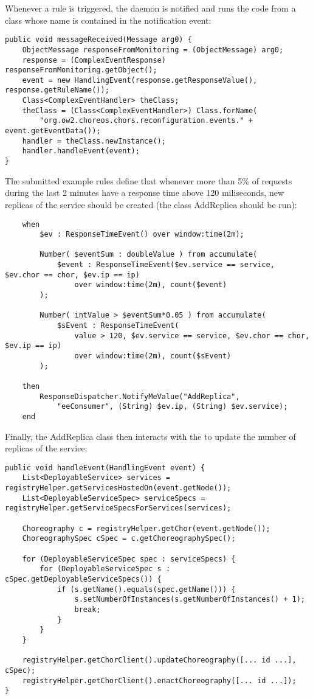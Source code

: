 Whenever a rule is triggered, the daemon is notified and runs the code
from a class whose name is contained in the notification event:

\begin{verbatim}
public void messageReceived(Message arg0) { 
    ObjectMessage responseFromMonitoring = (ObjectMessage) arg0;
    response = (ComplexEventResponse) responseFromMonitoring.getObject();
    event = new HandlingEvent(response.getResponseValue(), response.getRuleName());
    Class<ComplexEventHandler> theClass;
    theClass = (Class<ComplexEventHandler>) Class.forName(
        "org.ow2.choreos.chors.reconfiguration.events." + event.getEventData());
    handler = theClass.newInstance();
    handler.handleEvent(event);
}
\end{verbatim}

The submitted example rules define that whenever more than 5\% of requests
during the last 2 minutes have a response time above 120 miliseconds, new replicas of
the service should be created (the class \textsf{AddReplica} should be run):

\begin{verbatim}
    when
        $ev : ResponseTimeEvent() over window:time(2m);
        
        Number( $eventSum : doubleValue ) from accumulate(
            $event : ResponseTimeEvent($ev.service == service, $ev.chor == chor, $ev.ip == ip)
                over window:time(2m), count($event)
        );
            
        Number( intValue > $eventSum*0.05 ) from accumulate(
            $sEvent : ResponseTimeEvent(
                value > 120, $ev.service == service, $ev.chor == chor, $ev.ip == ip)
                over window:time(2m), count($sEvent)
        );

    then
        ResponseDispatcher.NotifyMeValue("AddReplica",
            "eeConsumer", (String) $ev.ip, (String) $ev.service);
    end
\end{verbatim}

Finally, the \textsf{AddReplica} class then interacts with the \ee to update the
number of replicas of the service:

\begin{verbatim}
public void handleEvent(HandlingEvent event) {
    List<DeployableService> services = registryHelper.getServicesHostedOn(event.getNode());
    List<DeployableServiceSpec> serviceSpecs = registryHelper.getServiceSpecsForServices(services);

    Choreography c = registryHelper.getChor(event.getNode());
    ChoreographySpec cSpec = c.getChoreographySpec();

    for (DeployableServiceSpec spec : serviceSpecs) {
        for (DeployableServiceSpec s : cSpec.getDeployableServiceSpecs()) {
            if (s.getName().equals(spec.getName())) {
                s.setNumberOfInstances(s.getNumberOfInstances() + 1);
                break;
            }
        }
    }

    registryHelper.getChorClient().updateChoreography([... id ...], cSpec);
    registryHelper.getChorClient().enactChoreography([... id ...]);
}
\end{verbatim}
